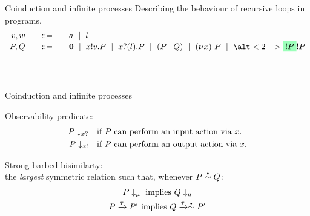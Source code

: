 \documentclass[aspectratio=169,hyperref={pdfpagelabels=false}]{beamer}
\begin{document}
\begin{frame}{Coinduction and infinite processes}
  Describing the behaviour of recursive loops in programs.
\begin{displaymath}
  \begin{array}{r@{\qquad}c@{\qquad}l}
    v,w & ::= & a \ \mid\ l \\
    P,Q & ::= & \Pend
               \ \mid\ \Pout{x}{v}{P}
               \ \mid\  \Pin{x}{l}{P}
               \ \mid\  \PBpar{P}{Q}
               \ \mid\  \Pres{x}{}{P}
               \ \mid\  \alt<2->{\hg{!P}}{!P}
  \end{array}
\end{displaymath}
  \ \\ \ \\

\end{frame}

\begin{frame}{Coinduction and infinite processes}

  Observability predicate:
  \begin{align*}
  P\downarrow_{x?}  &\quad \textrm{if \( P \) can perform an input action via \( x \).} \\
  P\downarrow_{x!} &\quad \textrm{if \( P \) can perform an output action via \( x \).}
  \end{align*}

  Strong barbed bisimilarty:\\
  \textrm{the \emph{largest} symmetric relation such that, whenever \( \sbbisim{P}{Q} \):}
\begin{gather}
  \observable{P}{\mu}~\textrm{implies}~\observable{Q}{\mu}\label{eq:bisim1} \\
  \transition{P}{\Atau}{P'}~\textrm{implies}~\transition{Q}{\Atau}{\sbbisim{}{} P'}%
\end{gather}
  

  


\end{frame}
\end{document}
